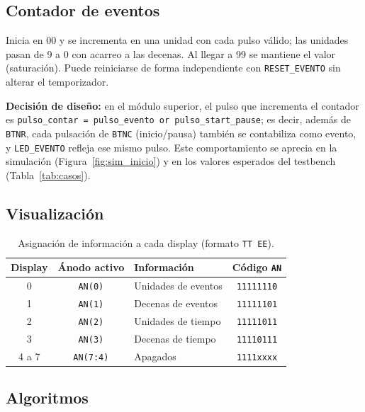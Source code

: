 \documentclass[letterpaper,12pt]{article}
\begin{document}
\subsection{Contador de eventos}
Inicia en 00 y se incrementa en una unidad con cada pulso válido; las unidades pasan de 9 a 0 con acarreo a las decenas. Al llegar a 99 se mantiene el valor (saturación). Puede reiniciarse de forma independiente con \texttt{RESET\_EVENTO} sin alterar el temporizador.

\textbf{Decisión de diseño:} en el módulo superior, el pulso que incrementa el contador es \texttt{pulso\_contar = pulso\_evento or pulso\_start\_pause}; es decir, además de \texttt{BTNR}, cada pulsación de \texttt{BTNC} (inicio/pausa) también se contabiliza como evento, y \texttt{LED\_EVENTO} refleja ese mismo pulso. Este comportamiento se aprecia en la simulación (Figura~\ref{fig:sim_inicio}) y en los valores esperados del testbench (Tabla~\ref{tab:casos}).

\subsection{Visualización}
\begin{table}[H]
\centering
\caption{Asignación de información a cada display (formato \texttt{TT EE}).}
\label{tab:displays}
\begin{tabular}{|c|c|l|c|}
\hline
\textbf{Display} & \textbf{Ánodo activo} & \textbf{Información} & \textbf{Código \texttt{AN}} \\ \hline
0 & \texttt{AN(0)} & Unidades de eventos & \texttt{11111110} \\ \hline
1 & \texttt{AN(1)} & Decenas de eventos  & \texttt{11111101} \\ \hline
2 & \texttt{AN(2)} & Unidades de tiempo  & \texttt{11111011} \\ \hline
3 & \texttt{AN(3)} & Decenas de tiempo   & \texttt{11110111} \\ \hline
4 a 7 & \texttt{AN(7:4)} & Apagados & \texttt{1111xxxx} \\ \hline
\end{tabular}
\end{table}

\subsection{Algoritmos}
\end{document}
